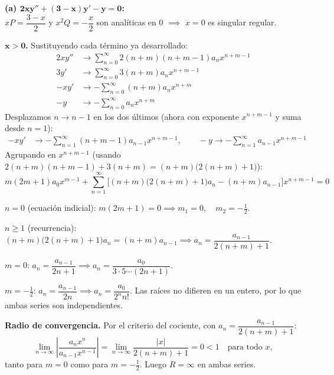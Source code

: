 \documentclass[11pt, a4paper]{article}
\begin{document}
\medskip
\noindent\textbf{(a) $\bm{2xy''+(3-x)y'-y=0}$:} \\
$xP=\dfrac{3-x}{2}$ y $x^2Q=-\dfrac{x}{2}$ son analíticas en $0$ $\implies$ $x=0$ es singular regular.

\vspace{0.2cm}\noindent\textbf{ $\bm{x>0}$.} Sustituyendo cada término ya desarrollado:
\begin{align*}
2xy'' &\to \sum_{n=0}^\infty 2(n+m)(n+m-1)a_nx^{n+m-1} \\
3y' &\to \sum_{n=0}^\infty 3(n+m)a_nx^{n+m-1} \\
-xy' &\to -\sum_{n=0}^\infty (n+m)a_nx^{n+m} \\
-y &\to -\sum_{n=0}^\infty a_nx^{n+m}
\end{align*}
Desplazamos $n\to n-1$ en los dos últimos (ahora con exponente $x^{n+m-1}$ y suma desde $n=1$):
\begin{align*}
-xy' &\to -\sum_{n=1}^\infty (n+m-1)a_{n-1}x^{n+m-1}, \qquad -y \to -\sum_{n=1}^\infty a_{n-1}x^{n+m-1}
\end{align*}
Agrupando en $x^{n+m-1}$ (usando $2(n+m)(n+m-1)+3(n+m)=(n+m)\big(2(n+m)+1\big)$):
\[
m(2m+1)a_0x^{m-1}+\sum_{n=1}^\infty\Big[(n+m)\big(2(n+m)+1\big)a_n-(n+m)a_{n-1}\Big]x^{n+m-1}=0
\]

\smallskip\noindent $n=0$ (ecuación indicial): $m(2m+1)=0 \implies m_1=0,\quad m_2=-\tfrac12$.

\smallskip\noindent $n\geq1$ (recurrencia): $(n+m)\big(2(n+m)+1\big)a_n=(n+m)a_{n-1} \implies a_n=\dfrac{a_{n-1}}{2(n+m)+1}$.

\smallskip\noindent $m=0$: $a_n=\dfrac{a_{n-1}}{2n+1} \implies a_n=\dfrac{a_0}{3\cdot5\cdots(2n+1)}$.

\smallskip\noindent $m=-\tfrac12$: $a_n=\dfrac{a_{n-1}}{2n} \implies a_n=\dfrac{a_0}{2^nn!}$.
Las raíces no difieren en un entero, por lo que ambas series son independientes.

\smallskip\noindent\textbf{Radio de convergencia.} Por el criterio del cociente, con $a_n=\dfrac{a_{n-1}}{2(n+m)+1}$:
\[
\lim_{n\to\infty}\left|\frac{a_{n}x^{n}}{a_{n-1}x^{n-1}}\right|=\lim_{n\to\infty}\frac{|x|}{2(n+m)+1}=0<1 \quad\text{para todo }x,
\]
tanto para $m=0$ como para $m=-\tfrac12$. Luego $R=\infty$ en ambas series.
\end{document}
